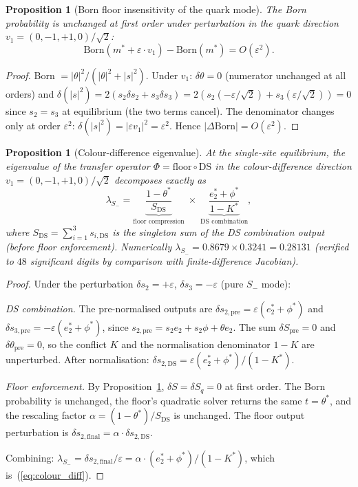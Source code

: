 \documentclass[11pt,a4paper]{article}
\newtheorem{proposition}[theorem]{Proposition}
\theoremstyle{definition}
\theoremstyle{remark}
\begin{document}
\begin{proposition}[Born floor insensitivity of the quark mode]\label{prop:quark_floor}
The Born probability is unchanged at first order under perturbation in the quark direction $v_1=(0,-1,+1,0)/\sqrt{2}$:
\[
\mathrm{Born}(m^*+\varepsilon\cdot v_1) - \mathrm{Born}(m^*) = O(\varepsilon^2).
\]
\end{proposition}

\begin{proof}
Born $=|\theta|^2/(|\theta|^2+|s|^2)$. Under $v_1$: $\delta\theta=0$ (numerator unchanged at all orders) and $\delta(|s|^2)=2(s_2\delta s_2+s_3\delta s_3)=2(s_2(-\varepsilon/\sqrt{2})+s_3(\varepsilon/\sqrt{2}))=0$ since $s_2=s_3$ at equilibrium (the two terms cancel). The denominator changes only at order $\varepsilon^2$: $\delta(|s|^2)=|\varepsilon v_1|^2=\varepsilon^2$. Hence $|\Delta\mathrm{Born}|=O(\varepsilon^2)$.
\end{proof}

\begin{proposition}[Colour-difference eigenvalue]\label{prop:colour_diff}
At the single-site equilibrium, the eigenvalue of the transfer operator $\Phi=\mathrm{floor}\circ\mathrm{DS}$ in the colour-difference direction $v_1=(0,-1,+1,0)/\sqrt{2}$ decomposes exactly as
\begin{equation}\label{eq:colour_diff}
\lambda_{S_-} = \underbrace{\frac{1-\theta^*}{S_{\mathrm{DS}}}}_{\text{floor compression}} \;\times\; \underbrace{\frac{e_2^*+\phi^*}{1-K^*}}_{\text{DS combination}},
\end{equation}
where $S_{\mathrm{DS}}=\sum_{i=1}^3 s_{i,\mathrm{DS}}$ is the singleton sum of the DS combination output (before floor enforcement). Numerically $\lambda_{S_-}=0.8679\times 0.3241=0.28131$ (verified to $48$ significant digits by comparison with finite-difference Jacobian).
\end{proposition}

\begin{proof}
Under the perturbation $\delta s_2=+\varepsilon$, $\delta s_3=-\varepsilon$ (pure $S_-$ mode):

\emph{DS combination.} The pre-normalised outputs are $\delta s_{2,\mathrm{pre}}=\varepsilon(e_2^*+\phi^*)$ and $\delta s_{3,\mathrm{pre}}=-\varepsilon(e_2^*+\phi^*)$, since $s_{2,\mathrm{pre}}=s_2 e_2+s_2\phi+\theta e_2$. The sum $\delta S_{\mathrm{pre}}=0$ and $\delta\theta_{\mathrm{pre}}=0$, so the conflict $K$ and the normalisation denominator $1-K$ are unperturbed. After normalisation: $\delta s_{2,\mathrm{DS}}=\varepsilon(e_2^*+\phi^*)/(1-K^*)$.

\emph{Floor enforcement.} By Proposition~\ref{prop:quark_floor}, $\delta S=\delta S_q=0$ at first order. The Born probability is unchanged, the floor's quadratic solver returns the same $t=\theta^*$, and the rescaling factor $\alpha=(1-\theta^*)/S_{\mathrm{DS}}$ is unchanged. The floor output perturbation is $\delta s_{2,\mathrm{final}}=\alpha\cdot\delta s_{2,\mathrm{DS}}$.

Combining: $\lambda_{S_-}=\delta s_{2,\mathrm{final}}/\varepsilon=\alpha\cdot(e_2^*+\phi^*)/(1-K^*)$, which is~(\ref{eq:colour_diff}).
\end{proof}
\end{document}
